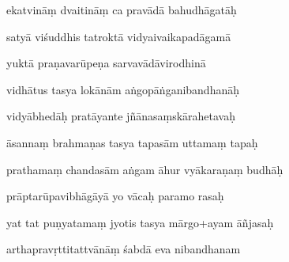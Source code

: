 \documentclass[article,12pt,a4paper]{memoir}%
\newcounter{parCount}
\begin{document}
	  
	  \pstart \leavevmode%
	ekatvināṃ dvaitināṃ ca pravādā bahudhāgatāḥ 
	{}
	\pend%
      

	  
	  \pstart {} satyā viśuddhis tatroktā vidyaivaikapadāgamā 
	{}
	\pend%
      

	  
	  \pstart \leavevmode%
	yuktā praṇavarūpeṇa sarvavādāvirodhinā 
	{}
	\pend%
      

	  
	  \pstart {} vidhātus tasya lokānām aṅgopāṅganibandhanāḥ 
	{}
	\pend%
      

	  
	  \pstart \leavevmode%
	vidyābhedāḥ pratāyante jñānasaṃskārahetavaḥ 
	{}
	\pend%
      

	  
	  \pstart {} āsannaṃ brahmaṇas tasya tapasām uttamaṃ tapaḥ 
	{}
	\pend%
      

	  
	  \pstart \leavevmode%
	prathamaṃ chandasām aṅgam āhur vyākaraṇaṃ budhāḥ 
	{}
	\pend%
      

	  
	  \pstart {} prāptarūpavibhāgāyā yo vācaḥ paramo rasaḥ 
	{}
	\pend%
      

	  
	  \pstart \leavevmode%
	yat tat puṇyatamaṃ jyotis tasya mārgo+ayam āñjasaḥ 
	{}
	\pend%
      

	  
	  \pstart {} arthapravṛttitattvānāṃ śabdā eva nibandhanam 
	{}
	\pend%
      
\end{document}
